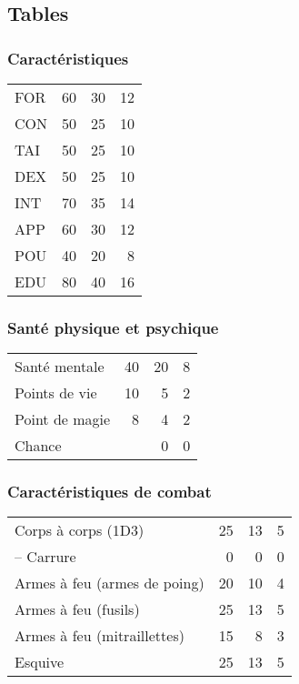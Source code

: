 \documentclass[11pt]{article}
\begin{document}
\begin{twocols}

\subsection{Tables}
\label{sec:org42dc73d}
\subsubsection{Caractéristiques}
\label{sec:orgd79ed36}

\begin{center}
\begin{tabular}{lrrr}
FOR & 60 & 30 & 12\\
CON & 50 & 25 & 10\\
TAI & 50 & 25 & 10\\
DEX & 50 & 25 & 10\\
INT & 70 & 35 & 14\\
APP & 60 & 30 & 12\\
POU & 40 & 20 & 8\\
EDU & 80 & 40 & 16\\
\end{tabular}
\end{center}

\subsubsection{Santé physique et psychique}
\label{sec:org3f6c67d}

\begin{center}
\begin{tabular}{lrrr}
Santé mentale & 40 & 20 & 8\\
Points de vie & 10 & 5 & 2\\
Point de magie & 8 & 4 & 2\\
Chance &  & 0 & 0\\
\end{tabular}
\end{center}

\subsubsection{Caractéristiques de combat}
\label{sec:org01d5938}

\begin{center}
\begin{tabular}{lrrr}
Corps à corps (1D3) & 25 & 13 & 5\\
-- Carrure & 0 & 0 & 0\\
Armes à feu (armes de poing) & 20 & 10 & 4\\
Armes à feu (fusils) & 25 & 13 & 5\\
Armes à feu (mitraillettes) & 15 & 8 & 3\\
Esquive & 25 & 13 & 5\\
\end{tabular}
\end{center}


\end{twocols}
\end{document}

